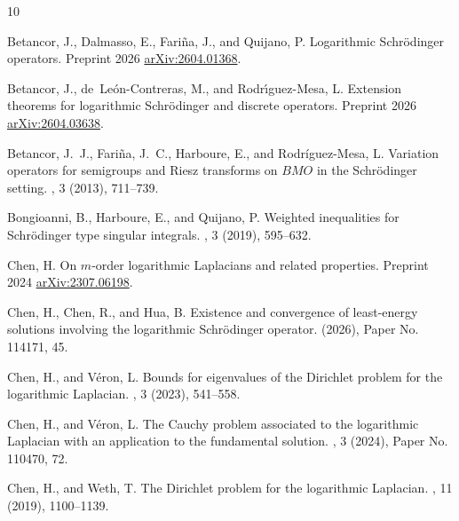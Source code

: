 \documentclass[10pt, a4paper, reqno]{amsart}
\theoremstyle{definition}
\theoremstyle{remark}
\numberwithin{equation}{section}
\begin{document}
\def\cprime{$'$} \def\ocirc#1{\ifmmode\setbox0=\hbox{$#1$}\dimen0=\ht0 \advance\dimen0 by1pt\rlap{\hbox to\wd0{\hss\raise\dimen0 \hbox{\hskip.2em$\scriptscriptstyle\circ$}\hss}}#1\else {\accent"17 #1}\fi}
\begin{thebibliography}{10}

{\sc Betancor, J., Dalmasso, E., Fari\~na, J., and Quijano, P.}
\newblock Logarithmic {S}chr\"odinger operators.
\newblock Preprint 2026 \href{https://arxiv.org/abs/2604.01368}{arXiv:2604.01368}.

{\sc Betancor, J., de~Le\'on-Contreras, M., and Rodr\'{\i}guez-Mesa, L.}
\newblock Extension theorems for logarithmic {S}chr\"odinger and discrete operators.
\newblock Preprint 2026 \href{https://arxiv.org/abs/2604.03638}{arXiv:2604.03638}.

{\sc Betancor, J.~J., Fari\~na, J.~C., Harboure, E., and Rodr\'iguez-Mesa, L.}
\newblock Variation operators for semigroups and {R}iesz transforms on {$BMO$} in the {S}chr\"odinger setting.
, 3 (2013), 711--739.

{\sc Bongioanni, B., Harboure, E., and Quijano, P.}
\newblock Weighted inequalities for {S}chr\"odinger type singular integrals.
, 3 (2019), 595--632.

{\sc Chen, H.}
\newblock On $m$-order logarithmic {L}aplacians and related properties.
\newblock Preprint 2024 \href{https://arxiv.org/abs/2307.06198}{arXiv:2307.06198}.

{\sc Chen, H., Chen, R., and Hua, B.}
\newblock Existence and convergence of least-energy solutions involving the logarithmic {S}chr\"odinger operator.
 (2026), Paper No. 114171, 45.

{\sc Chen, H., and V\'eron, L.}
\newblock Bounds for eigenvalues of the {D}irichlet problem for the logarithmic {L}aplacian.
, 3 (2023), 541--558.

{\sc Chen, H., and V\'eron, L.}
\newblock The {C}auchy problem associated to the logarithmic {L}aplacian with an application to the fundamental solution.
, 3 (2024), Paper No. 110470, 72.

{\sc Chen, H., and Weth, T.}
\newblock The {D}irichlet problem for the logarithmic {L}aplacian.
, 11 (2019), 1100--1139.


\end{thebibliography}
\end{document}
